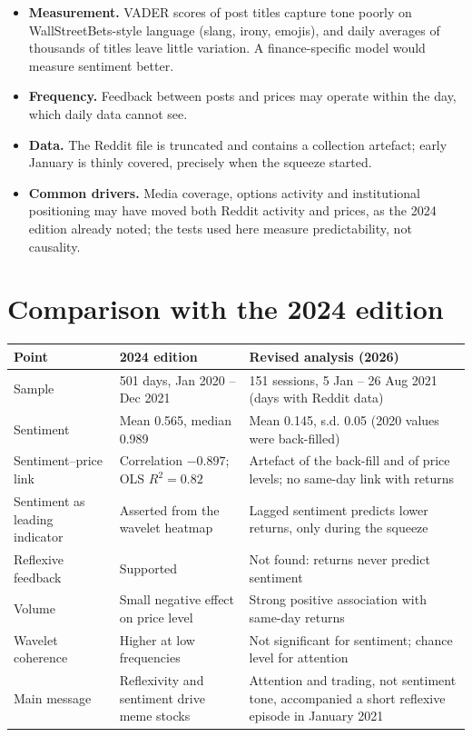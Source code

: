 \documentclass[11pt,a4paper]{article}
\begin{document}
\begin{itemize}
\item \textbf{Measurement.} VADER scores of post titles capture tone poorly on
WallStreetBets-style language (slang, irony, emojis), and daily averages of
thousands of titles leave little variation. A finance-specific model would
measure sentiment better.
\item \textbf{Frequency.} Feedback between posts and prices may operate within the
day, which daily data cannot see.
\item \textbf{Data.} The Reddit file is truncated and contains a collection
artefact; early January is thinly covered, precisely when the squeeze started.
\item \textbf{Common drivers.} Media coverage, options activity and institutional
positioning may have moved both Reddit activity and prices, as the 2024 edition
already noted; the tests used here measure predictability, not causality.
\end{itemize}

\section{Comparison with the 2024 edition}\label{sec:compare}

\begin{small}
\begin{tabular}{@{}L{0.22\textwidth}L{0.34\textwidth}L{0.38\textwidth}@{}}
\toprule
Point & 2024 edition & Revised analysis (2026) \\
\midrule
Sample & 501 days, Jan 2020 -- Dec 2021 & 151 sessions, 5 Jan -- 26 Aug 2021
(days with Reddit data) \\[2pt]
Sentiment & Mean 0.565, median 0.989 & Mean 0.145, s.d. 0.05 (2020 values
were back-filled) \\[2pt]
Sentiment--price link & Correlation $-0.897$; OLS $R^2=0.82$ & Artefact of the
back-fill and of price levels; no same-day link with returns \\[2pt]
Sentiment as leading indicator & Asserted from the wavelet heatmap & Lagged
sentiment predicts lower returns, only during the squeeze \\[2pt]
Reflexive feedback & Supported & Not found: returns never predict sentiment \\[2pt]
Volume & Small negative effect on price level & Strong positive association
with same-day returns \\[2pt]
Wavelet coherence & Higher at low frequencies & Not significant for sentiment;
chance level for attention \\[2pt]
Main message & Reflexivity and sentiment drive meme stocks & Attention and
trading, not sentiment tone, accompanied a short reflexive episode in January
2021 \\
\bottomrule
\end{tabular}
\end{small}
\end{document}
